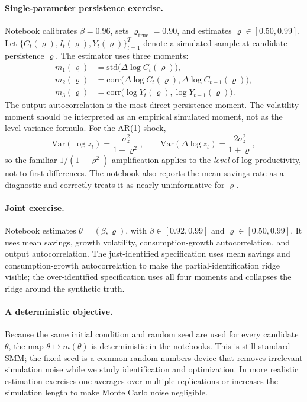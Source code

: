 \documentclass[11pt,a4paper]{report}
\begin{document}
\paragraph{Single-parameter persistence exercise.}
Notebook  calibrates $\beta=0.96$, sets $\varrho_{\mathrm{true}}=0.90$, and estimates $\varrho\in[0.50,0.99]$.  Let $\{C_t(\varrho),I_t(\varrho),Y_t(\varrho)\}_{t=1}^T$ denote a simulated sample at candidate persistence $\varrho$.  The estimator uses three moments:
\begin{align}
m_1(\varrho) &= \mathrm{std}\!\bigl(\Delta\log C_t(\varrho)\bigr), \\
m_2(\varrho) &= \mathrm{corr}\!\bigl(\Delta\log C_t(\varrho),\Delta\log C_{t-1}(\varrho)\bigr), \\
m_3(\varrho) &= \mathrm{corr}\!\bigl(\log Y_t(\varrho),\log Y_{t-1}(\varrho)\bigr).
\end{align}
The output autocorrelation is the most direct persistence moment.  The volatility moment should be interpreted as an empirical simulated moment, not as the level-variance formula.  For the AR(1) shock,
\[
\mathrm{Var}(\log z_t)=\frac{\sigma_z^2}{1-\varrho^2},
\qquad
\mathrm{Var}(\Delta\log z_t)=\frac{2\sigma_z^2}{1+\varrho},
\]
so the familiar $1/(1-\varrho^2)$ amplification applies to the \emph{level} of log productivity, not to first differences.  The notebook also reports the mean savings rate as a diagnostic and correctly treats it as nearly uninformative for $\varrho$.

\paragraph{Joint exercise.}
Notebook  estimates $\theta=(\beta,\varrho)$, with $\beta\in[0.92,0.99]$ and $\varrho\in[0.50,0.99]$.  It uses mean savings, growth volatility, consumption-growth autocorrelation, and output autocorrelation.  The just-identified specification uses mean savings and consumption-growth autocorrelation to make the partial-identification ridge visible; the over-identified specification uses all four moments and collapses the ridge around the synthetic truth.

\paragraph{A deterministic objective.}
Because the same initial condition and random seed are used for every candidate $\theta$, the map $\theta\mapsto m(\theta)$ is deterministic in the notebooks.  This is still standard SMM; the fixed seed is a common-random-numbers device that removes irrelevant simulation noise while we study identification and optimization.  In more realistic estimation exercises one averages over multiple replications or increases the simulation length to make Monte Carlo noise negligible.
\end{document}
